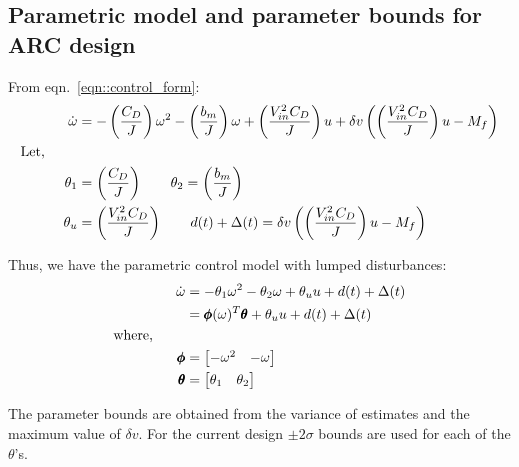 \subsection{Parametric model and parameter bounds for ARC design}
From eqn.~\ref{eqn::control_form}:
\begin{align*}
    \dot \omega &= -\left( \frac{C_D}{J} \right) \omega^2 - \left( \frac{b_m}{J} \right) \omega + \left( \frac{V_{in}^2 C_D}{J} \right) u + \delta v \left( \left( \frac{V_{in}^2 C_D}{J} \right) u - M_f \right)\\
    \text{Let, }\qquad &\\
    \theta_1 &= \left( \frac{C_D}{J} \right) \qquad
    \theta_2 = \left( \frac{b_m}{J} \right) \\
    \theta_u &=  \left( \frac{V_{in}^2 C_D}{J} \right) \qquad
    d(t) + \Delta(t) = \delta v \left( \left( \frac{V_{in}^2 C_D}{J} \right) u - M_f \right)
\end{align*}

Thus, we have the parametric control model with lumped disturbances:
\begin{align*}
    \dot \omega &= - \theta_1 \omega^2 - \theta_2 \omega + \theta_u u + d(t) + \Delta(t)\\
    &= \pmb \phi(\omega)^T \pmb \theta + \theta_u u + d(t) + \Delta(t)\\
    \text{where, } \qquad \\
    \pmb \phi &= \begin{bmatrix} -\omega^2 & - \omega \end{bmatrix}\\
    \pmb \theta &= \begin{bmatrix} \theta_1 & \theta_2 \end{bmatrix}
\end{align*}

The parameter bounds are obtained from the variance of estimates and the maximum
value of $\delta v$. For the current design $\pm 2\sigma$ bounds are used for
each of the $\theta$'s.
